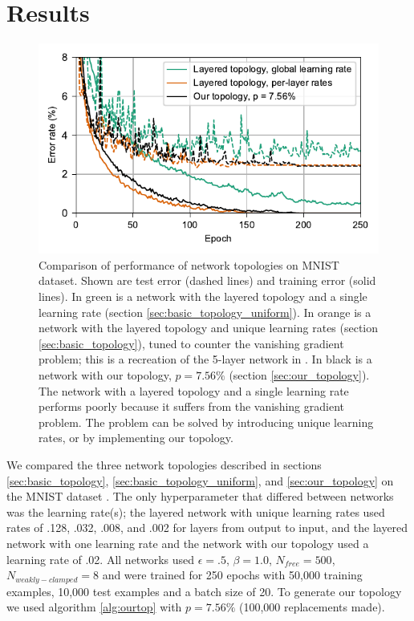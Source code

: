 \documentclass[format=sigconf]{acmart}
\begin{document}
\section{Results}

\begin{figure}
  \centering
  \includegraphics[width=\columnwidth]{figures/MNIST_network_comparison.pdf}
  \caption{Comparison of performance of network topologies on MNIST dataset. Shown are test error (dashed lines) and training error (solid lines). In green is a network with the layered topology and a single learning rate (section \ref{sec:basic_topology_uniform}). In orange is a network with the layered topology and unique learning rates (section \ref{sec:basic_topology}), tuned to counter the vanishing gradient problem; this is a recreation of the 5-layer network in \cite{scellier17}. In black is a network with our topology, $p=7.56\%$ (section \ref{sec:our_topology}). The network with a layered topology and a single learning rate performs poorly because it suffers from the vanishing gradient problem. The problem can be solved by introducing unique learning rates, or by implementing our topology.}
  \label{fig:mnist_comparison}
\end{figure}

We compared the three network topologies described in sections \ref{sec:basic_topology}, \ref{sec:basic_topology_uniform}, and \ref{sec:our_topology} on the MNIST dataset \cite{mnist1998}. The only hyperparameter that differed between networks was the learning rate(s); the layered network with unique learning rates used rates of .128, .032, .008, and .002 for layers from output to input, and the layered network with one learning rate and the network with our topology used a learning rate of .02. All networks used $\epsilon=.5$, $\beta=1.0$, $N_{free}=500$, $N_{weakly-clamped}=8$ and were trained for 250 epochs with 50,000 training examples, 10,000 test examples and a batch size of 20. To generate our topology we used algorithm \ref{alg:ourtop} with $p=7.56\%$ (100,000 replacements made).
\end{document}

